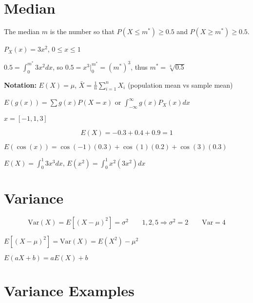 \section{Median}

\begin{definition}
The median $m$ is the number so that $P(X \leq m^*) \geq 0.5$ and $P(X \geq m^*) \geq 0.5$.
\end{definition}

\begin{example}
$P_X(x) = 3x^2$, $0 \leq x \leq 1$

$0.5 = \int_0^{m^*} 3x^2 dx$, so $0.5 = x^3 \Big|_0^{m^*} = (m^*)^3$, thus $m^* = \sqrt[3]{0.5}$
\end{example}

\textbf{Notation:} $E(X) = \mu$, $\bar{X} = \frac{1}{n} \sum_{i=1}^n X_i$ (population mean vs sample mean)

\begin{note}
$E(g(x)) = \sum g(x) P(X = x)$ or $\int_{-\infty}^{\infty} g(x) P_X(x) dx$
\end{note}

\begin{example}
$x = [-1, 1, 3]$

\[E(X) = -0.3 + 0.4 + 0.9 = 1\]

$E(\cos(x)) = \cos(-1)(0.3) + \cos(1)(0.2) + \cos(3)(0.3)$

$E(X) = \int_0^1 3x^3 dx$, $E(x^2) = \int_0^1 x^2(3x^2) dx$
\end{example}

\section{Variance}

\begin{definition}
\[\text{Var}(X) = E[(X - \mu)^2] = \sigma^2 \qquad 1, 2, 5 \Rightarrow \sigma^2 = 2 \qquad \text{Var} = 4\]
\end{definition}

\begin{theorem}
$E[(X - \mu)^2] = \text{Var}(X) = E(X^2) - \mu^2$
\end{theorem}

\begin{note}
$E(aX + b) = aE(X) + b$
\end{note}

\section{Variance Examples}

